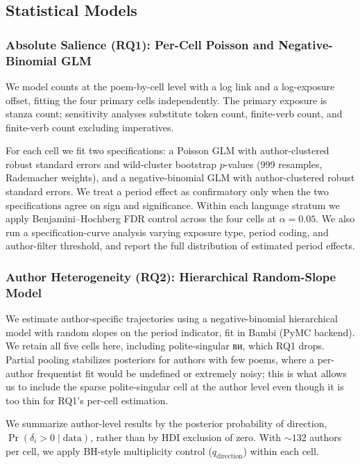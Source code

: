 \documentclass[12pt]{interact}
\theoremstyle{plain}%
\theoremstyle{definition}
\theoremstyle{remark}
\begin{document}
\subsection{Statistical Models}

\subsubsection{Absolute Salience (RQ1): Per-Cell Poisson and Negative-Binomial GLM}

We model counts at the poem-by-cell level with a log link and a log-exposure offset, fitting the four primary cells independently. The primary exposure is stanza count; sensitivity analyses substitute token
count, finite-verb count, and finite-verb count excluding imperatives.

For each cell we fit two specifications: a Poisson GLM with author-clustered robust standard errors and wild-cluster bootstrap $p$-values (999 resamples, Rademacher weights), and a negative-binomial GLM with author-clustered robust standard errors. We treat a period effect as confirmatory only when the two specifications agree on sign and significance. Within each language stratum we apply Benjamini–Hochberg FDR control across the four cells at $\alpha = 0.05$. We also run a specification-curve analysis varying exposure type, period coding, and author-filter threshold, and report the full distribution of estimated period effects.

\subsubsection{Author Heterogeneity (RQ2): Hierarchical Random-Slope Model}

We estimate author-specific trajectories using a negative-binomial hierarchical model with random slopes on the period indicator, fit in Bambi (PyMC backend). We retain all five cells here, including polite-singular {\ukrainianfont ви}, which RQ1 drops. Partial pooling stabilizes posteriors for authors with few poems, where a per-author frequentist fit would be undefined or extremely noisy; this is what allows us to include the sparse polite-singular cell at the author level even though it is too thin for RQ1's per-cell estimation.

We summarize author-level results by the posterior probability of direction, $\Pr(\delta_i > 0 \mid \text{data})$, rather than by HDI exclusion of zero. With $\sim 132$ authors per cell, we apply BH-style
multiplicity control ($q_{\text{direction}}$) within each cell.
\end{document}
